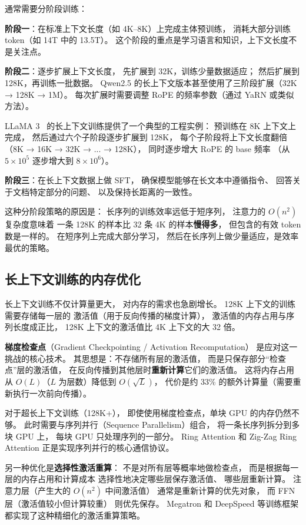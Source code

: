 通常需要分阶段训练：

\textbf{阶段一}：在标准上下文长度（如 4K--8K）上完成主体预训练，
消耗大部分训练 token（如 14T 中的 13.5T）。
这个阶段的重点是学习语言和知识，上下文长度不是关注点。

\textbf{阶段二}：逐步扩展上下文长度，
先扩展到 32K，训练少量数据适应；
然后扩展到 128K，再训练一批数据。
Qwen2.5 的长上下文版本甚至使用了三阶段扩展（32K → 128K → 1M）。
每次扩展时需要调整 RoPE 的频率参数（通过 YaRN 或类似方法）。

LLaMA 3~\cite{dubey2024llama3} 的长上下文训练提供了一个典型的工程实例：
预训练在 8K 上下文上完成，
然后通过六个子阶段逐步扩展到 128K，
每个子阶段将上下文长度翻倍（8K → 16K → 32K → ... → 128K），
同时逐步增大 RoPE 的 base 频率
（从 $5 \times 10^5$ 逐步增大到 $8 \times 10^6$）。

\textbf{阶段三}：在长上下文数据上做 SFT，
确保模型能够在长文本中遵循指令、
回答关于文档特定部分的问题、
以及保持长距离的一致性。

这种分阶段策略的原因是：
长序列的训练效率远低于短序列，
注意力的 $O(n^2)$ 复杂度意味着
一条 128K 的样本比 32 条 4K 的样本\textbf{慢得多}，
但包含的有效 token 数是一样的。
在短序列上完成大部分学习，
然后在长序列上做少量适应，是效率最优的策略。

\subsection{长上下文训练的内存优化}

长上下文训练不仅计算量更大，
对内存的需求也急剧增长。
128K 上下文的训练需要存储每一层的
激活值（用于反向传播的梯度计算），
激活值的内存占用与序列长度成正比，
128K 上下文的激活值比 4K 上下文的大 32 倍。

\textbf{梯度检查点}（Gradient Checkpointing / Activation Recomputation）
是应对这一挑战的核心技术。
其思想是：不存储所有层的激活值，
而是只保存部分“检查点”层的激活值，
在反向传播到其他层时\textbf{重新计算}它们的激活值。
这将内存占用从 $O(L)$（$L$ 为层数）降低到 $O(\sqrt{L})$，
代价是约 33\% 的额外计算量（需要重新执行一次前向传播）。

对于超长上下文训练（128K+），
即使使用梯度检查点，单块 GPU 的内存仍然不够。
此时需要与序列并行（Sequence Parallelism）组合，
将一条长序列拆分到多块 GPU 上，
每块 GPU 只处理序列的一部分。
Ring Attention 和 Zig-Zag Ring Attention
正是实现序列并行的核心通信协议。

另一种优化是\textbf{选择性激活重算}：
不是对所有层等概率地做检查点，
而是根据每一层的内存占用和计算成本
选择性地决定哪些层保存激活值、
哪些层重新计算。
注意力层（产生大的 $O(n^2)$ 中间激活值）
通常是重新计算的优先对象，
而 FFN 层（激活值较小但计算较重）
则优先保存。
Megatron 和 DeepSpeed 等训练框架
都实现了这种精细化的激活重算策略。

